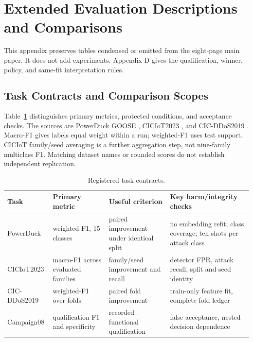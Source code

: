 \documentclass[manuscript,screen,nonacm]{acmart}
\begin{document}
\section{Extended Evaluation Descriptions and Comparisons}
\label{app:evaluation-details}

This appendix preserves tables condensed or omitted from the eight-page
main paper. It does not add experiments. Appendix D gives the qualification,
winner, policy, and same-fit interpretation rules.

\subsection{Task Contracts and Comparison Scopes}
\label{sec:experimental-setup}

Table~\ref{tab:task-contracts} distinguishes primary metrics, protected
conditions, and acceptance checks. The sources are PowerDuck GOOSE
\citep{zemanek2022}, CICIoT2023 \citep{neto2023}, and CIC-DDoS2019
\citep{sharafaldin2019}. Macro-F1 gives labels equal weight within a run;
weighted-F1 uses test support. CICIoT family/seed averaging is a further
aggregation step, not nine-family multiclass F1. Matching dataset names
or rounded scores do not establish independent replication.

\begin{table}[htbp]
\caption{Registered task contracts.}
\label{tab:task-contracts}
\centering
\begin{tabularx}{\columnwidth}{
>{\raggedright\arraybackslash}p{}
>{\raggedright\arraybackslash}p{}
>{\raggedright\arraybackslash}p{}
>{\raggedright\arraybackslash}X}
\toprule
\textbf{Task} & \textbf{Primary metric} & \textbf{Useful criterion} & \textbf{Key harm/integrity checks} \\
\midrule
PowerDuck & weighted-F1, 15 classes & paired improvement under identical split & no embedding refit; class coverage; ten shots per attack class \\
CICIoT2023 & macro-F1 across evaluated families & family/seed improvement and recall & detector FPR, attack recall, split and seed identity \\
CIC-DDoS2019 & weighted-F1 over folds & paired fold improvement & train-only feature fit, complete fold ledger \\
Campaign08 & qualification F1 and specificity & recorded functional qualification & false acceptance, nested decision dependence \\
\bottomrule
\end{tabularx}
\end{table}
\end{document}
